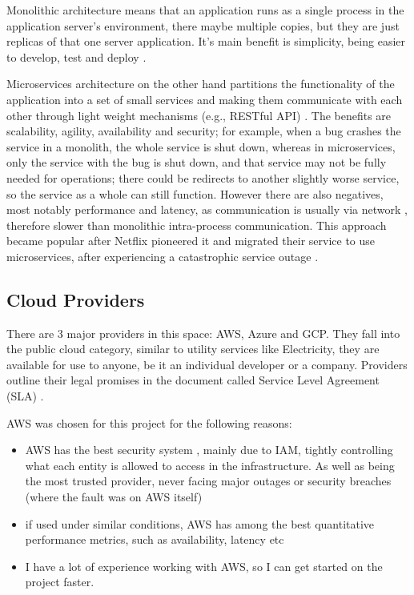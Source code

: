 Monolithic architecture means that an application runs as a single process in the application server's environment, there maybe multiple copies, but they are just replicas of that one server application. It's main benefit is simplicity, being easier to develop, test and deploy \cite{monolith}.

Microservices architecture on the other hand partitions the functionality of the application into a set of small services and making them communicate with each other through light weight mechanisms (e.g., RESTful API) \cite{fowler2014eb}. The benefits are scalability, agility, availability and security; for example, when a bug crashes the service in a monolith, the whole service is shut down, whereas in microservices, only the service with the bug is shut down, and that service may not be fully needed for operations; there could be redirects to another slightly worse service, so the service as a whole can still function. However there are also negatives, most notably performance and latency, as communication is usually via network \cite{Li2021Understanding}, therefore slower than monolithic intra-process communication. This approach became popular after Netflix pioneered it and migrated their service to use microservices, after experiencing a catastrophic service outage \cite{monolith}.
\subsection{Cloud Providers}
There are 3 major providers in this space: AWS, Azure and GCP. They fall into the public cloud category, similar to utility services like Electricity, they are available for use to anyone, be it an individual developer or a company. Providers outline their legal promises in the document called Service Level Agreement (SLA) \cite{cloudSLA}.

AWS was chosen for this project for the following reasons:
\begin{itemize}
    \item{AWS has the best security system \cite{Narula2015Cloud}, mainly due to IAM, tightly controlling what each entity is allowed to access in the infrastructure. As well as being the most trusted provider, never facing major outages or security breaches (where the fault was on AWS itself)}
    \item{if used under similar conditions, AWS has among the best quantitative performance metrics, such as availability, latency etc \cite{CloudMetrics}  }
    \item {I have a lot of experience working with AWS, so I can get started on the project faster.}
\end{itemize}
